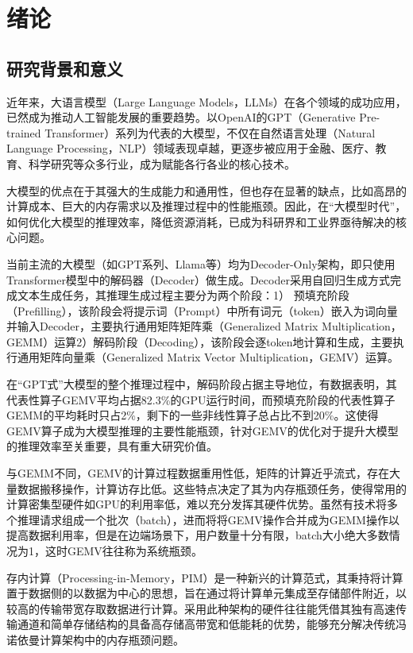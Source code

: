 \chapter{绪论}
\section{研究背景和意义}
近年来，大语言模型（Large Language Models，LLMs）在各个领域的成功应用，已然成为推动人工智能发展的重要趋势。以OpenAI的GPT（Generative Pre-trained Transformer）系列为代表的大模型，不仅在自然语言处理（Natural Language Processing，NLP）领域表现卓越，更逐步被应用于金融、医疗、教育、科学研究等众多行业，成为赋能各行各业的核心技术。

大模型的优点在于其强大的生成能力和通用性，但也存在显著的缺点，比如高昂的计算成本、巨大的内存需求以及推理过程中的性能瓶颈。因此，在“大模型时代”，如何优化大模型的推理效率，降低资源消耗，已成为科研界和工业界亟待解决的核心问题。

当前主流的大模型（如GPT系列、Llama等）均为Decoder-Only架构，即只使用Transformer模型\cite{Transformer}中的解码器（Decoder）做生成\cite{GPT-1,Llama2}。Decoder采用自回归生成方式完成文本生成任务，其推理生成过程主要分为两个阶段：1） 预填充阶段（Prefilling），该阶段会将提示词（Prompt）中所有词元（token）嵌入为词向量并输入Decoder，主要执行通用矩阵矩阵乘（Generalized Matrix Multiplication，GEMM）运算2）解码阶段（Decoding），该阶段会逐token地计算和生成，主要执行通用矩阵向量乘（Generalized Matrix Vector Multiplication，GEMV）运算。

在“GPT式”大模型的整个推理过程中，解码阶段占据主导地位\cite{InferLinear}，有数据表明，其代表性算子GEMV平均占据82.3\%的GPU运行时间，而预填充阶段的代表性算子GEMM的平均耗时只占2\%，剩下的一些非线性算子总占比不到20\%\cite{SamsungHotChips}。这使得GEMV算子成为大模型推理的主要性能瓶颈，针对GEMV的优化对于提升大模型的推理效率至关重要，具有重大研究价值。

与GEMM不同，GEMV的计算过程数据重用性低，矩阵的计算近乎流式，存在大量数据搬移操作，计算访存比低。这些特点决定了其为内存瓶颈任务，使得常用的计算密集型硬件如GPU的利用率低，难以充分发挥其硬件优势。虽然有技术将多个推理请求组成一个批次（batch），进而将将GEMV操作合并成为GEMM操作以提高数据利用率\cite{Orca}，但是在边端场景下，用户数量十分有限，batch大小绝大多数情况为1，这时GEMV往往称为系统瓶颈\cite{CellularLogicInMemory}。

存内计算（Processing-in-Memory，PIM）是一种新兴的计算范式，其秉持将计算置于数据侧的以数据为中心的思想，旨在通过将计算单元集成至存储部件附近，以较高的传输带宽存取数据进行计算。采用此种架构的硬件往往能凭借其独有高速传输通道和简单存储结构的具备高存储高带宽和低能耗的优势，能够充分解决传统冯诺依曼计算架构中的内存瓶颈问题。

